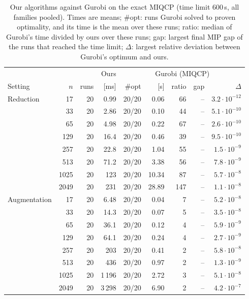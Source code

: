 \begin{table}[htbp]
\centering
\small
\caption{Our algorithms against Gurobi on the exact MIQCP (time limit 600\,s, all families pooled). Times are means; \#opt: runs Gurobi solved to proven optimality, and its time is the mean over these runs; ratio: median of Gurobi's time divided by ours over these runs; gap: largest final MIP gap of the runs that reached the time limit; $\Delta$: largest relative deviation between Gurobi's optimum and ours.}
\label{tab:solvers}
\begin{tabular}{lrrr|rrrrr}
\hline
 & & & Ours & \multicolumn{5}{c}{Gurobi (MIQCP)} \\
Setting & $n$ & runs & [ms] & \#opt & [s] & ratio & gap & $\Delta$ \\
\hline
Reduction & 17 & 20 & 0.99 & 20/20 & 0.06 & 66 & -- & $3.2\cdot 10^{-12}$ \\
 & 33 & 20 & 2.86 & 20/20 & 0.10 & 44 & -- & $5.1\cdot 10^{-10}$ \\
 & 65 & 20 & 4.98 & 20/20 & 0.22 & 67 & -- & $2.6\cdot 10^{-10}$ \\
 & 129 & 20 & 16.4 & 20/20 & 0.46 & 39 & -- & $9.5\cdot 10^{-10}$ \\
 & 257 & 20 & 22.8 & 20/20 & 1.04 & 55 & -- & $1.5\cdot 10^{-9}$ \\
 & 513 & 20 & 71.2 & 20/20 & 3.38 & 56 & -- & $7.8\cdot 10^{-9}$ \\
 & 1025 & 20 & 123 & 20/20 & 10.34 & 87 & -- & $5.7\cdot 10^{-8}$ \\
 & 2049 & 20 & 231 & 20/20 & 28.89 & 147 & -- & $1.1\cdot 10^{-8}$ \\
\hline
Augmentation & 17 & 20 & 6.48 & 20/20 & 0.04 & 7 & -- & $5.2\cdot 10^{-8}$ \\
 & 33 & 20 & 14.3 & 20/20 & 0.07 & 5 & -- & $3.5\cdot 10^{-8}$ \\
 & 65 & 20 & 36.1 & 20/20 & 0.12 & 4 & -- & $5.9\cdot 10^{-9}$ \\
 & 129 & 20 & 64.1 & 20/20 & 0.24 & 4 & -- & $2.7\cdot 10^{-9}$ \\
 & 257 & 20 & 203 & 20/20 & 0.41 & 2 & -- & $5.8\cdot 10^{-8}$ \\
 & 513 & 20 & 436 & 20/20 & 0.97 & 2 & -- & $1.3\cdot 10^{-9}$ \\
 & 1025 & 20 & 1\,196 & 20/20 & 2.72 & 3 & -- & $5.1\cdot 10^{-8}$ \\
 & 2049 & 20 & 3\,298 & 20/20 & 6.90 & 2 & -- & $4.2\cdot 10^{-7}$ \\
\hline
\end{tabular}
\end{table}
